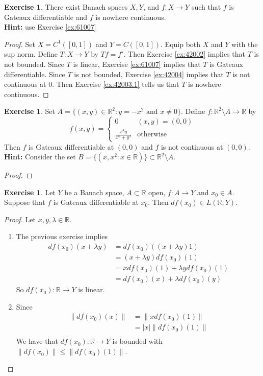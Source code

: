 \documentclass[12pt]{amsart}
\theoremstyle{definition}
\newtheorem{ex}[definition]{Exercise}
\newcommand{\lam}{\lambda}
\newcommand{\R}{\mathbb{R}}
\newcommand{\lex}[1]{\label{ex:#1}}
\newcommand{\rex}[1]{Exercise \ref{ex:#1}}
\begin{document}
	\begin{ex} \lex{61008}
	There exist Banach spaces $X,Y$, and $f:X \rightarrow Y$ such that $f$ is Gateaux differentiable and $f$ is nowhere continuous. \\
	\textbf{Hint:} use \rex{61007}
	\end{ex}
	
	\begin{proof}
	Set $X = C^1([0, 1])$ and $Y = C([0,1])$. Equip both $X$ and $Y$ with the sup norm. Define $T: X \rightarrow Y$ by $Tf = f'$. Then \rex{42002} implies that $T$ is not bounded. Since $T$ is linear, \rex{61007} implies that $T$ is Gateaux differentiable. Since $T$ is not bounded, \rex{42004} implies that $T$ is not continuous at $0$. Then \rex{42003.1} tells us that $T$ is nowhere continuous. 
	\end{proof}
	
	\begin{ex} \lex{61008.5}
	Set $A = \{(x,y) \in \R^2: y = -x^2 \text{ and } x \neq 0\}$. Define $f: \R^2 \setminus A \rightarrow \R$ by 
	\[f(x,y) = 
	\begin{cases}
	0 & (x,y) = (0,0) \\
	\frac{x^4y}{x^6 + y^3} & \text{otherwise}
	\end{cases}	
	\]
	Then $f$ is Gateaux differentiable at $(0,0)$ and $f$ is not continuous at $(0,0)$. \\
	\textbf{Hint:} Consider the set $B = \{(x, x^2:x \in \R)\} \subset \R^2 \setminus A$. 
	\end{ex}
	
	\begin{proof}
	
	\end{proof}
	
	
	
	\begin{ex} \lex{61009}
	Let $Y$ be a Banach space, $A \subset \R$ open, $f:A \rightarrow Y$ and $x_0 \in A$. Suppose that $f$ is Gateaux differentiable at $x_0$. Then $df(x_0) \in L(\R,Y)$.
	\end{ex}
	
	\begin{proof}
	Let $x,y ,\lam \in \R$. 
	\begin{enumerate}
	\item The previous exercise implies 
	\begin{align*}
	df(x_0)(x + \lam y) 
	&= df(x_0)((x+\lam y)1)  \\
	&= (x+\lam y)df(x_0)(1) \\
	&= xdf(x_0)(1) + \lam y df(x_0)(1) \\
	&= df(x_0)(x) + \lam df(x_0)(y)
	\end{align*}
	So $df(x_0):\R \rightarrow Y$ is linear.
	\item Since 
	\begin{align*}
	\|df(x_0)(x)\| 
	&= \|xdf(x_0)(1)\| \\
	&= |x| \|df(x_0)(1)\| \\
	\end{align*}	
	We have that $df(x_0):\R \rightarrow Y$ is bounded with $\|df(x_0)\| \leq \|df(x_0)(1)\|$. 
	\end{enumerate}
	\end{proof}
	
\end{document}
